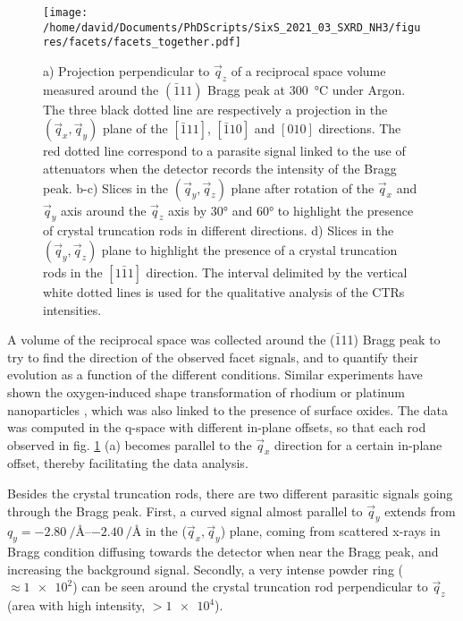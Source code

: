 \begin{figure}[!htb]
    \centering
    \texttt{[image: /home/david/Documents/PhDScripts/SixS\_2021\_03\_SXRD\_NH3/figures/facets/facets\_together.pdf]}
    \caption{
        a) Projection perpendicular to $\vec{q}_z$ of a reciprocal space volume measured around the $(\bar{1}11)$ Bragg peak at \qty{300}{\degreeCelsius} under Argon.
        The three black dotted line are respectively a projection in the $(\vec{q}_x, \vec{q}_y)$ plane of the $[\bar{1}11]$, $[\bar{1}10]$ and $[010]$ directions.
        The red dotted line correspond to a parasite signal linked to the use of attenuators when the detector records the intensity of the Bragg peak.
        b-c) Slices in the $(\vec{q}_y, \vec{q}_z)$ plane after rotation of the $\vec{q}_x$ and $\vec{q}_y$ axis around the $\vec{q}_z$ axis by \ang{30} and \ang{60} to highlight the presence of crystal truncation rods in different directions.
        d) Slices in the $(\vec{q}_y, \vec{q}_z)$ plane to highlight the presence of a crystal truncation rods in the $[1\bar{1}1]$ direction.
        The interval delimited by the vertical white dotted lines is used for the qualitative analysis of the CTRs intensities.
    }
    \label{fig:FacetMaps}
\end{figure}

A volume of the reciprocal space was collected around the ($\bar{1}$11) Bragg peak to try to find the direction of the observed facet signals, and to quantify their evolution as a function of the different conditions.
Similar experiments have shown the oxygen-induced shape transformation of rhodium \parencite{Nolte2008} or platinum nanoparticles \parencite{Hejral2013}, which was also linked to the presence of surface oxides.
The data was computed in the q-space with different in-plane offsets, so that each rod observed in fig. \ref{fig:FacetMaps} (a) becomes parallel to the $\vec{q}_x$ direction for a certain in-plane offset, thereby facilitating the data analysis.

Besides the crystal truncation rods, there are two different parasitic signals going through the Bragg peak.
First, a curved signal almost parallel to $\vec{q}_y$ extends from $q_y = \qtyrange{-2.80}{-2.40}{\per\angstrom}$ in the ($\vec{q}_x, \vec{q}_y$) plane, coming from scattered x-rays in Bragg condition diffusing towards the detector when near the Bragg peak, and increasing the background signal.
Secondly, a very intense powder ring ($\approx \num{1e2}$) can be seen around the crystal truncation rod perpendicular to $\vec{q}_z$ (area with high intensity, $> \num{1e4}$).

